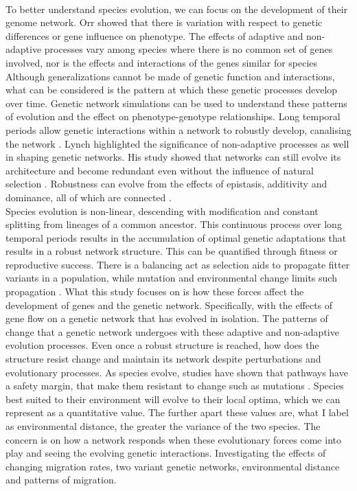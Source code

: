 \\To better understand species evolution, we can focus on the development of their genome network. Orr showed that there is variation with respect to genetic differences or gene influence on phenotype. The effects of adaptive and non-adaptive processes vary among species where there is no common set of genes involved, nor is the effects and interactions of the genes similar for species \cite{orr1998population} Although generalizations cannot be made of genetic function and interactions, what can be considered is the pattern at which these genetic processes develop over time. Genetic network simulations can be used to understand these patterns of evolution and the effect on phenotype-genotype relationships. Long temporal periods allow genetic interactions within a network to robustly develop, canalising the network \cite{orr1998population,lynch2007evolution}. Lynch highlighted the significance of non-adaptive processes as well in shaping genetic networks. His study showed that networks can still evolve its architecture and become redundant even without the influence of natural selection \cite{lynch2007evolution}. Robustness can evolve from the effects of epistasis, additivity and dominance, all of which are connected \cite{omholt2000gene}.
\\Species evolution is non-linear, descending with modification and constant splitting from lineages of a common ancestor. This continuous process over long temporal periods results in the accumulation of optimal genetic adaptations that results in a robust network structure. This can be quantified through fitness or reproductive success. There is a balancing act as selection aids to propagate fitter variants in a population, while mutation and environmental change limits such propagation \cite{burt1995evolution}. What this study focuses on is how these forces affect the development of genes and the genetic network. Specifically, with the effects of gene flow on a genetic network that has evolved in isolation. The patterns of change that a genetic network undergoes with these adaptive and non-adaptive evolution processes. Even once a robust structure is reached, how does the structure resist change and maintain its network despite perturbations and evolutionary processes. As species evolve, studies have shown that pathways have a safety margin, that make them resistant to change such as mutations \cite{bourguet1999evolution}. Species best suited to their environment will evolve to their local optima, which we can represent as a quantitative value. The further apart these values are, what I label as environmental distance, the greater the variance of the two species. The concern is on how a network responds when these evolutionary forces come into play and seeing the evolving genetic interactions. Investigating the effects of changing migration rates, two variant genetic networks, environmental distance and patterns of migration.
